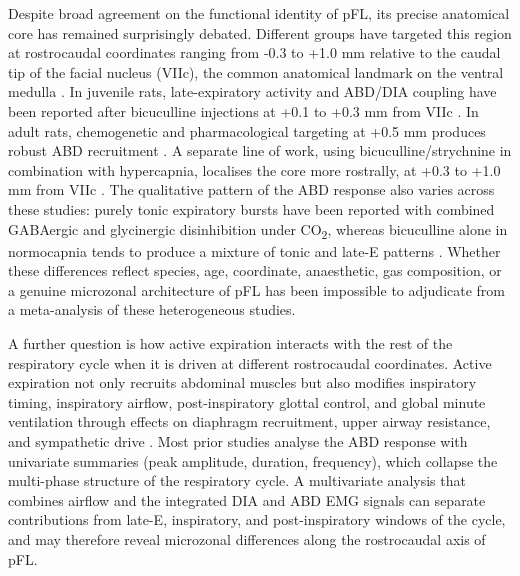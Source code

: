 Despite broad agreement on the functional identity of pFL, its precise anatomical core has remained surprisingly debated. Different groups have targeted this region at rostrocaudal coordinates ranging from -0.3 to +1.0 mm relative to the caudal tip of the facial nucleus (VIIc), the common anatomical landmark on the ventral medulla \citep{Pagliardini2011Active,Huckstepp2015Role,deBritto2017GABAergic,Silva2019Importance,Boutin2017Respiratory}. In juvenile rats, late-expiratory activity and ABD/DIA coupling have been reported after bicuculline injections at +0.1 to +0.3 mm from VIIc \citep{deBritto2017GABAergic}. In adult rats, chemogenetic and pharmacological targeting at +0.5 mm produces robust ABD recruitment \citep{Huckstepp2015Role,Pagliardini2011Active}. A separate line of work, using bicuculline/strychnine in combination with hypercapnia, localises the core more rostrally, at +0.3 to +1.0 mm from VIIc \citep{Silva2019Importance}. The qualitative pattern of the ABD response also varies across these studies: purely tonic expiratory bursts have been reported with combined GABAergic and glycinergic disinhibition under CO\textsubscript{2}, whereas bicuculline alone in normocapnia tends to produce a mixture of tonic and late-E patterns \citep{Pagliardini2011Active,deBritto2017GABAergic,Silva2019Importance}. Whether these differences reflect species, age, coordinate, anaesthetic, gas composition, or a genuine microzonal architecture of pFL has been impossible to adjudicate from a meta-analysis of these heterogeneous studies.

A further question is how active expiration interacts with the rest of the respiratory cycle when it is driven at different rostrocaudal coordinates. Active expiration not only recruits abdominal muscles but also modifies inspiratory timing, inspiratory airflow, post-inspiratory glottal control, and global minute ventilation through effects on diaphragm recruitment, upper airway resistance, and sympathetic drive \citep{Molkov2010Computational,Dutschmann2006Pontine,Zoccal2018Expiratory,Barnett2017Partial,Dhingra2020LateE}. Most prior studies analyse the ABD response with univariate summaries (peak amplitude, duration, frequency), which collapse the multi-phase structure of the respiratory cycle. A multivariate analysis that combines airflow and the integrated DIA and ABD EMG signals can separate contributions from late-E, inspiratory, and post-inspiratory windows of the cycle, and may therefore reveal microzonal differences along the rostrocaudal axis of pFL.

